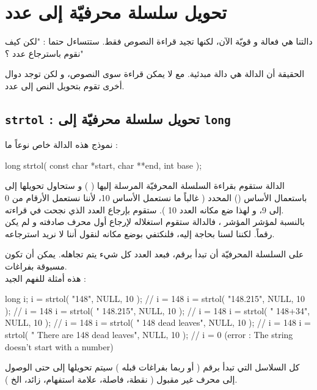 \section{تحويل سلسلة محرفيّة إلى عدد}

دالتنا
هي فعالة و قويّة الآن، لكنها تجيد قراءة النصوص فقط. ستتساءل حتما : "لكن كيف نقوم باسترجاع عدد ؟"

الحقيقة أن الدالة
هي دالة مبدئية. مع
لا يمكن قراءة سوى النصوص، و لكن توجد دوال أخرى تقوم بتحويل النص إلى عدد.

\subsection{\texttt{strtol} : تحويل سلسلة محرفيّة إلى \texttt{long}}

نموذج هذه الدالة خاص نوعاً ما :

\begin{Csource}
  long strtol( const char *start, char **end, int base );
\end{Csource}

الدالة ستقوم بقراءة السلسلة المحرفيّة المرسلة إليها
(  )
و ستحاول تحويلها إلى
باستعمال الأساس
()
المحدد ( غالباً ما نستعمل الأساس 10، لأننا نستعمل الأرقام من 0 إلى 9، و لهذا ضع مكانه العدد 10 ). ستقوم بإرجاع العدد الذي نجحت في قراءته.\\
بالنسبة لمؤشر المؤشر
،
فالدالة ستقوم استغلاله لإرجاع أول محرف صادفته و لم يكن رقماً. لكننا لسنا بحاجة إليه، فلنكتفي بوضع
مكانه لنقول أننا لا نريد استرجاعه.

على السلسلة المحرفيّة أن تبدأ برقم، فبعد العدد كل شيء يتم تجاهله. يمكن أن تكون مسبوقة بفراغات.\\
هذه أمثلة للفهم الجيد :

\begin{Csource}
  long i;
  i = strtol( "148", NULL, 10 ); // i = 148
  i = strtol( "148.215", NULL, 10 ); // i = 148
  i = strtol( " 148.215", NULL, 10 ); // i = 148
  i = strtol( " 148+34", NULL, 10 ); // i = 148
  i = strtol( " 148 dead leaves", NULL, 10 ); // i = 148
  i = strtol( " There are 148 dead leaves", NULL, 10 ); // i = 0 (error : The string doesn’t start with a number)
\end{Csource}

كل السلاسل التي تبدأ برقم ( أو ربما بفراغات قبله ) سيتم تحويلها إلى
حتى الوصول إلى محرف غير مقبول ( نقطة، فاصلة، علامة استفهام، زائد، الخ ).

